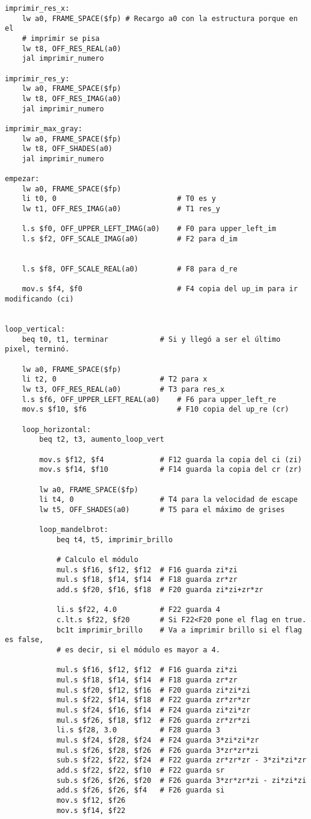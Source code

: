 \documentclass[a4paper,10pt]{article}
\begin{document}
\begin{verbatim}
imprimir_res_x:
	lw a0, FRAME_SPACE($fp) # Recargo a0 con la estructura porque en el 
	# imprimir se pisa
	lw t8, OFF_RES_REAL(a0)
	jal imprimir_numero
	
imprimir_res_y:
	lw a0, FRAME_SPACE($fp)
	lw t8, OFF_RES_IMAG(a0)
	jal imprimir_numero
	
imprimir_max_gray:
	lw a0, FRAME_SPACE($fp)
	lw t8, OFF_SHADES(a0)
	jal imprimir_numero

empezar:
	lw a0, FRAME_SPACE($fp)
	li t0, 0 							# T0 es y
	lw t1, OFF_RES_IMAG(a0) 			# T1 res_y
	
	l.s $f0, OFF_UPPER_LEFT_IMAG(a0) 	# F0 para upper_left_im
	l.s $f2, OFF_SCALE_IMAG(a0) 		# F2 para d_im
	

	l.s $f8, OFF_SCALE_REAL(a0) 		# F8 para d_re

	mov.s $f4, $f0 						# F4 copia del up_im para ir modificando (ci)


loop_vertical:
	beq t0, t1, terminar 			# Si y llegó a ser el último pixel, terminó.
	
	lw a0, FRAME_SPACE($fp)
	li t2, 0		 				# T2 para x
	lw t3, OFF_RES_REAL(a0)			# T3 para res_x
	l.s $f6, OFF_UPPER_LEFT_REAL(a0)	# F6 para upper_left_re
	mov.s $f10, $f6 					# F10 copia del up_re (cr)
	
	loop_horizontal:
		beq t2, t3, aumento_loop_vert

		mov.s $f12, $f4 			# F12 guarda la copia del ci (zi)
		mov.s $f14, $f10 			# F14 guarda la copia del cr (zr)

		lw a0, FRAME_SPACE($fp)
		li t4, 0 					# T4 para la velocidad de escape
		lw t5, OFF_SHADES(a0)		# T5 para el máximo de grises

		loop_mandelbrot:
			beq t4, t5, imprimir_brillo

			# Calculo el módulo
			mul.s $f16, $f12, $f12 	# F16 guarda zi*zi
			mul.s $f18, $f14, $f14 	# F18 guarda zr*zr
			add.s $f20, $f16, $f18 	# F20 guarda zi*zi+zr*zr

			li.s $f22, 4.0 			# F22 guarda 4
			c.lt.s $f22, $f20 		# Si F22<F20 pone el flag en true.
			bc1t imprimir_brillo 	# Va a imprimir brillo si el flag es false, 
			# es decir, si el módulo es mayor a 4.

			mul.s $f16, $f12, $f12 	# F16 guarda zi*zi
			mul.s $f18, $f14, $f14 	# F18 guarda zr*zr
			mul.s $f20, $f12, $f16 	# F20 guarda zi*zi*zi
			mul.s $f22, $f14, $f18 	# F22 guarda zr*zr*zr
			mul.s $f24, $f16, $f14 	# F24 guarda zi*zi*zr
			mul.s $f26, $f18, $f12 	# F26 guarda zr*zr*zi
			li.s $f28, 3.0 			# F28 guarda 3
			mul.s $f24, $f28, $f24 	# F24 guarda 3*zi*zi*zr
			mul.s $f26, $f28, $f26 	# F26 guarda 3*zr*zr*zi
			sub.s $f22, $f22, $f24 	# F22 guarda zr*zr*zr - 3*zi*zi*zr
			add.s $f22, $f22, $f10 	# F22 guarda sr
			sub.s $f26, $f26, $f20 	# F26 guarda 3*zr*zr*zi - zi*zi*zi
			add.s $f26, $f26, $f4 	# F26 guarda si
			mov.s $f12, $f26
			mov.s $f14, $f22
			

\end{verbatim}
\end{document}
